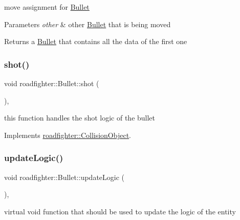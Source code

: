 move assignment for \hyperlink{classroadfighter_1_1Bullet}{Bullet} 
\begin{DoxyParams}{Parameters}
{\em other} & other \hyperlink{classroadfighter_1_1Bullet}{Bullet} that is being moved \\
\hline
\end{DoxyParams}
\begin{DoxyReturn}{Returns}
a \hyperlink{classroadfighter_1_1Bullet}{Bullet} that contains all the data of the first one 
\end{DoxyReturn}
\mbox{\label{classroadfighter_1_1Bullet_acaacd303f1f4e55c5029d4a4cbe1d9b1}} 
\subsubsection{\texorpdfstring{shot()}{shot()}}
{\footnotesize\ttfamily void roadfighter\+::\+Bullet\+::shot (\begin{DoxyParamCaption}{ }\end{DoxyParamCaption})\hspace{0.3cm}{\ttfamily [override]}, {\ttfamily [virtual]}}

this function handles the shot logic of the bullet 

Implements \hyperlink{classroadfighter_1_1CollisionObject_a338a1071e6d5e25439e57c8673308dbb}{roadfighter\+::\+Collision\+Object}.

\mbox{\label{classroadfighter_1_1Bullet_a13aa730279ee8590d0eb2f9e6c01f265}} 
\subsubsection{\texorpdfstring{update\+Logic()}{updateLogic()}}
{\footnotesize\ttfamily void roadfighter\+::\+Bullet\+::update\+Logic (\begin{DoxyParamCaption}{ }\end{DoxyParamCaption})\hspace{0.3cm}{\ttfamily [override]}, {\ttfamily [virtual]}}

virtual void function that should be used to update the logic of the entity 

